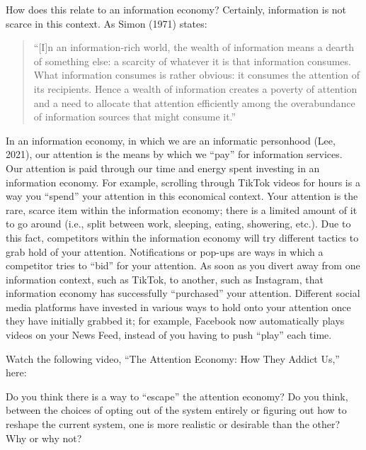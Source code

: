 \documentclass[
  letterpaper,
  DIV=11,
  numbers=noendperiod]{scrreprt}
\begin{document}
How does this relate to an information economy? Certainly, information
is not scarce in this context. As Simon (1971) states:

\begin{quote}
``{[}I{]}n an information-rich world, the wealth of information means a
dearth of something else: a scarcity of whatever it is that information
consumes. What information consumes is rather obvious: it consumes the
attention of its recipients. Hence a wealth of information creates a
poverty of attention and a need to allocate that attention efficiently
among the overabundance of information sources that might consume it.''
\end{quote}

In an information economy, in which we are an informatic personhood
(Lee, 2021), our attention is the means by which we ``pay'' for
information services. Our attention is paid through our time and energy
spent investing in an information economy. For example, scrolling
through TikTok videos for hours is a way you ``spend'' your attention in
this economical context. Your attention is the rare, scarce item within
the information economy; there is a limited amount of it to go around
(i.e., split between work, sleeping, eating, showering, etc.). Due to
this fact, competitors within the information economy will try different
tactics to grab hold of your attention. Notifications or pop-ups are
ways in which a competitor tries to ``bid'' for your attention. As soon
as you divert away from one information context, such as TikTok, to
another, such as Instagram, that information economy has successfully
``purchased'' your attention. Different social media platforms have
invested in various ways to hold onto your attention once they have
initially grabbed it; for example, Facebook now automatically plays
videos on your News Feed, instead of you having to push ``play'' each
time.~~

Watch the following video, ``The Attention Economy: How They Addict
Us,'' here:

\begin{tcolorbox}[enhanced jigsaw, arc=.35mm, bottomrule=.15mm, bottomtitle=1mm, breakable, colback=white, colbacktitle=quarto-callout-tip-color!10!white, colframe=quarto-callout-tip-color-frame, coltitle=black, left=2mm, leftrule=.75mm, opacityback=0, opacitybacktitle=0.6, rightrule=.15mm, title=\textcolor{quarto-callout-tip-color}{\faLightbulb}\hspace{0.5em}{Pause and reflect}, titlerule=0mm, toprule=.15mm, toptitle=1mm]

Do you think there is a way to ``escape'' the attention economy? Do you
think, between the choices of opting out of the system entirely or
figuring out how to reshape the current system, one is more realistic or
desirable than the other? Why or why not?

\end{tcolorbox}
\end{document}
